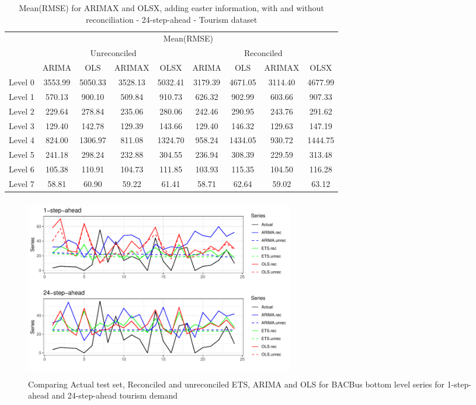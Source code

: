 \documentclass[11pt,a4paper,]{article}
\begin{document}
\begin{table}[t]

\caption{\label{tab:easterRMSE}Mean(RMSE) for ARIMAX and OLSX, adding easter information, with and without reconciliation - 24-step-ahead - Tourism dataset}
\centering
\begin{tabular}{ccccccccc}
\toprule
\multicolumn{1}{c}{} & \multicolumn{8}{c}{Mean(RMSE)} \\
\cmidrule(l{2pt}r{2pt}){2-9}
\multicolumn{1}{c}{} & \multicolumn{4}{c}{Unreconciled} & \multicolumn{4}{c}{Reconciled} \\
\cmidrule(l{2pt}r{2pt}){2-5} \cmidrule(l{2pt}r{2pt}){6-9}
 & ARIMA & OLS & ARIMAX & OLSX & ARIMA & OLS & ARIMAX & OLSX\\
\midrule
Level 0 & 3553.99 & 5050.33 & 3528.13 & 5032.41 & 3179.39 & 4671.05 & 3114.40 & 4677.99\\
Level 1 & 570.13 & 900.10 & 509.84 & 910.73 & 626.32 & 902.99 & 603.66 & 907.33\\
Level 2 & 229.64 & 278.84 & 235.06 & 280.06 & 242.46 & 290.95 & 243.76 & 291.62\\
Level 3 & 129.40 & 142.78 & 129.39 & 143.66 & 129.40 & 146.32 & 129.63 & 147.19\\
Level 4 & 824.00 & 1306.97 & 811.08 & 1324.70 & 958.24 & 1434.05 & 930.72 & 1444.75\\
Level 5 & 241.18 & 298.24 & 232.88 & 304.55 & 236.94 & 308.39 & 229.59 & 313.48\\
Level 6 & 105.38 & 110.91 & 104.73 & 111.85 & 103.93 & 115.35 & 104.50 & 116.28\\
Level 7 & 58.81 & 60.90 & 59.22 & 61.41 & 58.71 & 62.64 & 59.02 & 63.12\\
\bottomrule
\end{tabular}
\end{table}

\begin{figure}

{\centering \includegraphics[width=450px,height=300px]{hcf_files/figure-latex/forecstrolling24tourism-1} 

}

\caption{Comparing Actual test set, Reconciled and unreconciled ETS, ARIMA and OLS for BACBus bottom level series for 1-step-ahead and 24-step-ahead tourism demand}\label{fig:forecstrolling24tourism}
\end{figure}
\end{document}
